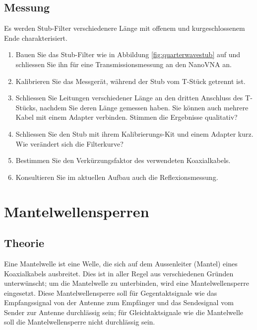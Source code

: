 \documentclass[twoside,a4paper,11pt,halfparskip,DIV=11,notitlepage]{scrartcl}
\begin{document}
\subsection{Messung}

Es werden Stub-Filter verschiedenere Länge mit offenem und kurgeschlossenem Ende charakterisiert.

\begin{enumerate}
    \item Bauen Sie das Stub-Filter wie in Abbildung \ref{fig:quarterwavestub} auf und schliessen Sie ihn für eine
        Transmissionsmessung an den NanoVNA an.
    \item Kalibrieren Sie das Messgerät, während der Stub vom T-Stück getrennt ist.
    \item Schliessen Sie Leitungen verschiedener Länge an den dritten Anschluss des T-Stücks, nachdem Sie deren
        Länge gemessen haben. Sie können auch mehrere Kabel mit einem Adapter verbinden. Stimmen die Ergebnisse qualitativ?
    \item Schliessen Sie den Stub mit ihrem Kalibrierungs-Kit und einem Adapter kurz. Wie verändert sich die Filterkurve?
    \item Bestimmen Sie den Verkürzungsfaktor des verwendeten Koaxialkabels.
    \item Konsultieren Sie im aktuellen Aufbau auch die Reflexionsmessung.
\end{enumerate}


\section{Mantelwellensperren}

\subsection{Theorie}

Eine Mantelwelle ist eine Welle, die sich auf dem Aussenleiter (Mantel) eines
Koaxialkabels ausbreitet. Dies ist in aller Regel aus verschiedenen Gründen
unterwünscht; um die Mantelwelle zu unterbinden, wird eine Mantelwellensperre
eingesetzt. Diese Mantelwellensperre soll für Gegentaktsignale wie das
Empfangssignal von der Antenne zum Empfänger und das Sendesignal vom Sender
zur Antenne durchlässig sein; für Gleichtaktsignale wie die Mantelwelle soll
die Mantelwellensperre nicht durchlässig sein.
\end{document}
